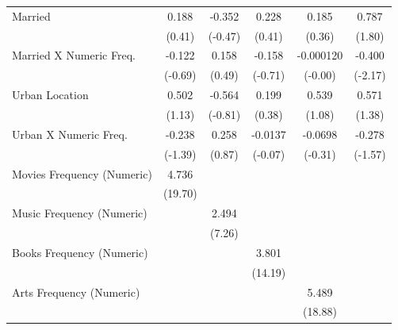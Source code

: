 {\begin{longtable}{l*{5}{c}}
Married             &       0.188       &      -0.352       &       0.228       &       0.185       &       0.787\sym{*}\\
                    &      (0.41)       &     (-0.47)       &      (0.41)       &      (0.36)       &      (1.80)       \\
Married X Numeric Freq.&      -0.122       &       0.158       &      -0.158       &   -0.000120       &      -0.400\sym{*}\\
                    &     (-0.69)       &      (0.49)       &     (-0.71)       &     (-0.00)       &     (-2.17)       \\
Urban Location      &       0.502       &      -0.564       &       0.199       &       0.539       &       0.571       \\
                    &      (1.13)       &     (-0.81)       &      (0.38)       &      (1.08)       &      (1.38)       \\
Urban X Numeric Freq.&      -0.238       &       0.258       &     -0.0137       &     -0.0698       &      -0.278       \\
                    &     (-1.39)       &      (0.87)       &     (-0.07)       &     (-0.31)       &     (-1.57)       \\
Movies Frequency (Numeric)&       4.736\sym{*}&                   &                   &                   &                   \\
                    &     (19.70)       &                   &                   &                   &                   \\
Music Frequency (Numeric)&                   &       2.494\sym{*}&                   &                   &                   \\
                    &                   &      (7.26)       &                   &                   &                   \\
Books Frequency (Numeric)&                   &                   &       3.801\sym{*}&                   &                   \\
                    &                   &                   &     (14.19)       &                   &                   \\
Arts Frequency (Numeric)&                   &                   &                   &       5.489\sym{*}&                   \\
                    &                   &                   &                   &     (18.88)       &                   \\

\end{longtable}}
